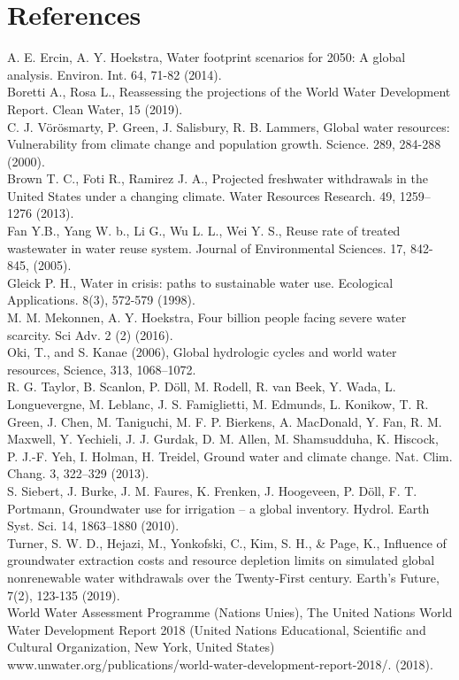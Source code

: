 \documentclass[
  12pt,
]{article}
\begin{document}
\newpage

\hypertarget{references}{%
\section{References}\label{references}}

A. E. Ercin, A. Y. Hoekstra, Water footprint scenarios for 2050: A
global analysis. Environ. Int. 64, 71-82 (2014).\\
Boretti A., Rosa L., Reassessing the projections of the World Water
Development Report. Clean Water, 15 (2019).\\
C. J. Vörösmarty, P. Green, J. Salisbury, R. B. Lammers, Global water
resources: Vulnerability from climate change and population growth.
Science. 289, 284-288 (2000).\\
Brown T. C., Foti R., Ramirez J. A., Projected freshwater withdrawals in
the United States under a changing climate. Water Resources Research.
49, 1259--1276 (2013).\\
Fan Y.B., Yang W. b., Li G., Wu L. L., Wei Y. S., Reuse rate of treated
wastewater in water reuse system. Journal of Environmental Sciences. 17,
842-845, (2005).\\
Gleick P. H., Water in crisis: paths to sustainable water use.
Ecological Applications. 8(3), 572-579 (1998).\\
M. M. Mekonnen, A. Y. Hoekstra, Four billion people facing severe water
scarcity. Sci Adv. 2 (2) (2016).\\
Oki, T., and S. Kanae (2006), Global hydrologic cycles and world water
resources, Science, 313, 1068--1072.\\
R. G. Taylor, B. Scanlon, P. Döll, M. Rodell, R. van Beek, Y. Wada, L.
Longuevergne, M. Leblanc, J. S. Famiglietti, M. Edmunds, L. Konikow, T.
R. Green, J. Chen, M. Taniguchi, M. F. P. Bierkens, A. MacDonald, Y.
Fan, R. M. Maxwell, Y. Yechieli, J. J. Gurdak, D. M. Allen, M.
Shamsudduha, K. Hiscock, P. J.-F. Yeh, I. Holman, H. Treidel, Ground
water and climate change. Nat. Clim. Chang. 3, 322--329 (2013).\\
S. Siebert, J. Burke, J. M. Faures, K. Frenken, J. Hoogeveen, P. Döll,
F. T. Portmann, Groundwater use for irrigation -- a global inventory.
Hydrol. Earth Syst. Sci. 14, 1863--1880 (2010).\\
Turner, S. W. D., Hejazi, M., Yonkofski, C., Kim, S. H., \& Page, K.,
Influence of groundwater extraction costs and resource depletion limits
on simulated global nonrenewable water withdrawals over the Twenty‐First
century. Earth's Future, 7(2), 123-135 (2019).\\
World Water Assessment Programme (Nations Unies), The United Nations
World Water Development Report 2018 (United Nations Educational,
Scientific and Cultural Organization, New York, United States)
www.unwater.org/publications/world-water-development-report-2018/.
(2018).
\end{document}
